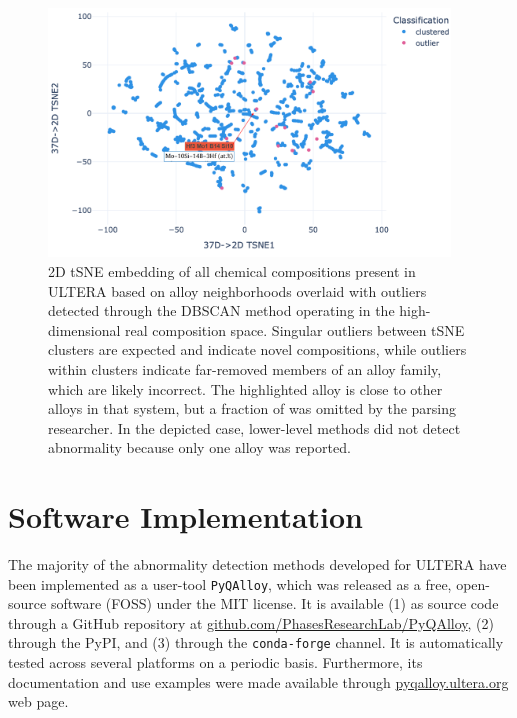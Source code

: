 \begin{figure}[H]
    \centering
    \includegraphics[width=0.95\textwidth]{pyqalloy/PyQAlloy_tSNE+DBSCAN.png}
    \caption{2D tSNE embedding of all chemical compositions present in ULTERA based on alloy neighborhoods overlaid with outliers detected through the DBSCAN method operating in the high-dimensional real composition space. Singular outliers between tSNE clusters are expected and indicate novel compositions, while outliers within clusters indicate far-removed members of an alloy family, which are likely incorrect. The highlighted  alloy is close to other alloys in that system, but a fraction of  was omitted by the parsing researcher. In the depicted case, lower-level methods did not detect abnormality because only one alloy was reported.}
    \label{pyqalloy:fig:patternglobal}
\end{figure}

\section{Software Implementation} \label{pyqalloy:sec:software}

The majority of the abnormality detection methods developed for ULTERA have been implemented as a user-tool \texttt{PyQAlloy}, which was released as a free, open-source software (FOSS) under the MIT license. It is available (1) as source code through a GitHub repository at \href{https://github.com/PhasesResearchLab/PyQAlloy}{github.com/PhasesResearchLab/PyQAlloy}, (2) through the PyPI, and (3) through the \texttt{conda-forge} channel. It is automatically tested across several platforms on a periodic basis. Furthermore, its documentation and use examples were made available through \href{https://pyqalloy.ultera.org/}{pyqalloy.ultera.org} web page.




\printbibliography[heading=subbibintoc]